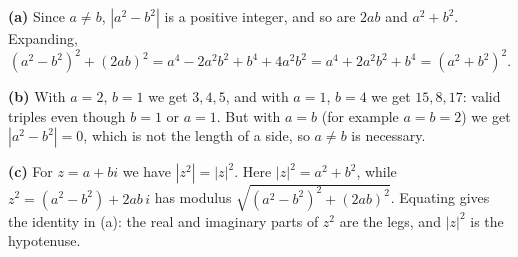 \textbf{(a)} Since $a\ne b$, $\left|a^2-b^2\right|$ is a positive integer, and so are $2ab$ and $a^2+b^2$. Expanding,
\[\left(a^2-b^2\right)^2+(2ab)^2=a^4-2a^2b^2+b^4+4a^2b^2=a^4+2a^2b^2+b^4=\left(a^2+b^2\right)^2.\]

\textbf{(b)} With $a=2$, $b=1$ we get $3,4,5$, and with $a=1$, $b=4$ we get $15,8,17$: valid triples even though $b=1$ or $a=1$. But with $a=b$ (for example $a=b=2$) we get $\left|a^2-b^2\right|=0$, which is not the length of a side, so $a\ne b$ is necessary.

\textbf{(c)} For $z=a+bi$ we have $|z^2|=|z|^2$. Here $|z|^2=a^2+b^2$, while $z^2=\left(a^2-b^2\right)+2ab\,i$ has modulus $\sqrt{\left(a^2-b^2\right)^2+(2ab)^2}$. Equating gives the identity in (a): the real and imaginary parts of $z^2$ are the legs, and $|z|^2$ is the hypotenuse.
